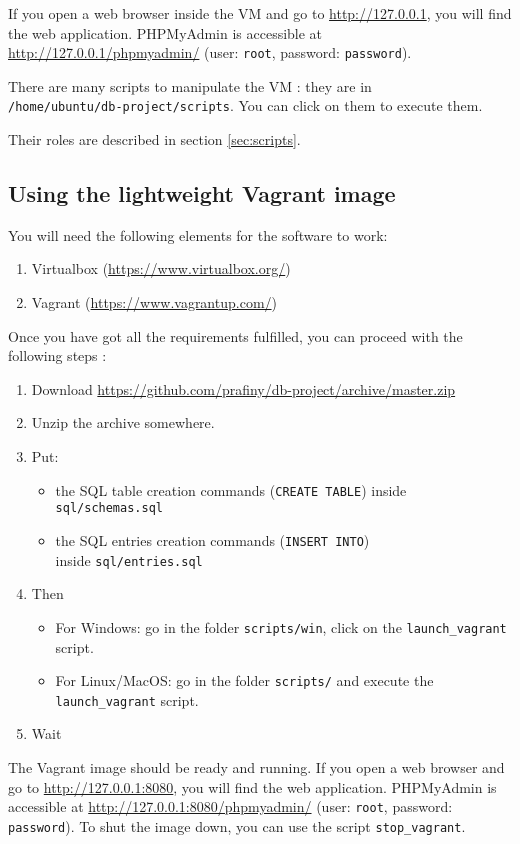 \documentclass[twoside,a4paper,12pt]{article}
\begin{document}
If you open a web browser inside the VM and go to \url{http://127.0.0.1}, you will find the web application. PHPMyAdmin is accessible at \url{http://127.0.0.1/phpmyadmin/} (user: \texttt{root}, password: \texttt{password}).

There are many scripts to manipulate the VM : they are in\\ \texttt{/home/ubuntu/db-project/scripts}. You can click on them to execute them.

Their roles are described in section \ref{sec:scripts}. 

\newpage
\subsection{Using the lightweight Vagrant image}
You will need the following elements for the software to work:
\begin{enumerate}
\item Virtualbox (\url{https://www.virtualbox.org/})
\item Vagrant (\url{https://www.vagrantup.com/})
\end{enumerate}

Once you have got all the requirements fulfilled, you can proceed with the following steps :

\begin{enumerate}
\item Download \url{https://github.com/prafiny/db-project/archive/master.zip}
\item Unzip the archive somewhere.
\item Put:
\begin{itemize}
	\item the SQL table creation commands (\texttt{CREATE TABLE}) inside \texttt{sql/schemas.sql}
	\item the SQL entries creation commands (\texttt{INSERT INTO})\\ inside \texttt{sql/entries.sql}
\end{itemize}
\item Then
\begin{itemize}
	\item For Windows: go in the folder \texttt{scripts/win}, click on the \texttt{launch\_vagrant} script.
	\item For Linux/MacOS: go in the folder \texttt{scripts/} and execute the \texttt{launch\_vagrant} script.
\end{itemize}
\item Wait
\end{enumerate}
The Vagrant image should be ready and running. If you open a web browser and go to \url{http://127.0.0.1:8080}, you will find the web application. PHPMyAdmin is accessible at \url{http://127.0.0.1:8080/phpmyadmin/} (user: \texttt{root}, password: \texttt{password}). To shut the image down, you can use the script \texttt{stop\_vagrant}.
\end{document}
